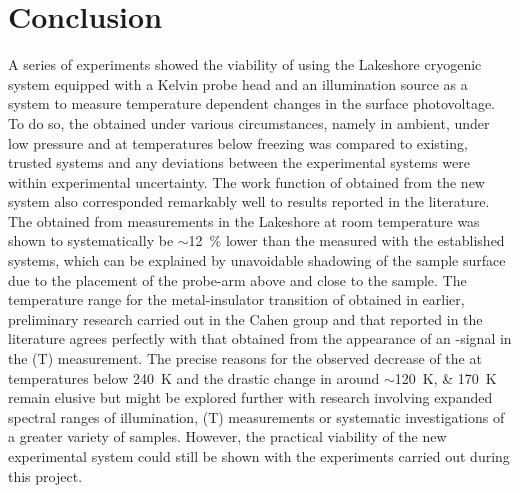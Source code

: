 \section{Conclusion}
A series of experiments showed the viability of using the Lakeshore cryogenic system equipped with a \McA{} Kelvin probe head and an \led{} illumination source as a system to measure temperature dependent changes in the surface photovoltage. To do so, the \cpd{} obtained under various circumstances, namely in ambient, under low pressure and at temperatures below freezing was compared to existing, trusted systems and any deviations between the experimental systems were within experimental uncertainty. The work function of \wvadiox{} obtained from the new system also corresponded remarkably well to results reported in the literature. The \spv{} obtained from measurements in the Lakeshore at room temperature was shown to systematically be $\sim$\SI{12}{\percent} lower than the \spv{} measured with the established systems, which can be explained by unavoidable shadowing of the sample surface due to the placement of the probe-arm above and close to the sample. The temperature range for the metal-insulator transition of \wvadiox{} obtained in earlier, preliminary research carried out in the Cahen group and that reported in the literature agrees perfectly with that obtained from the appearance of an \spv{}-signal in the \spv{}(T) measurement. The precise reasons for the observed decrease of the \spv{} at temperatures below \SI{240}{\kelvin} and the drastic change in \wf{} around $\sim$\SIlist{120;170}{\kelvin} remain elusive but might be explored further with research involving expanded spectral ranges of illumination, \sps{}(T) measurements or systematic investigations of a greater variety of \vadiox{} samples. However, the practical viability of the new experimental system could still be shown with the experiments carried out during this project.


